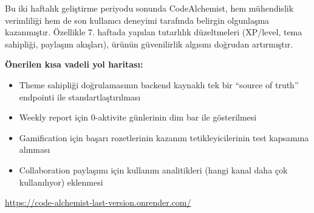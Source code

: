 \documentclass[12pt,a4paper]{article}
\begin{document}
Bu iki haftalık geliştirme periyodu sonunda CodeAlchemist, hem mühendislik verimliliği hem de son kullanıcı deneyimi tarafında belirgin olgunlaşma kazanmıştır. Özellikle 7. haftada yapılan tutarlılık düzeltmeleri (XP/level, tema sahipliği, paylaşım akışları), ürünün güvenilirlik algısını doğrudan artırmıştır.

\textbf{Önerilen kısa vadeli yol haritası:}
\begin{itemize}[leftmargin=*]
  \item Theme sahipliği doğrulamasının backend kaynaklı tek bir ``source of truth'' endpointi ile standartlaştırılması
  \item Weekly report için 0-aktivite günlerinin dim bar ile gösterilmesi
  \item Gamification için başarı rozetlerinin kazanım tetikleyicilerinin test kapsamına alınması
  \item Collaboration paylaşımı için kullanım analitikleri (hangi kanal daha çok kullanılıyor) eklenmesi
\end{itemize}

\begin{ozetbox}
\begin{center}
\large
\href{https://code-alchemist-last-version.onrender.com/}{https://code-alchemist-last-version.onrender.com/}
\end{center}
\end{ozetbox}

\vspace{1em}
\end{document}
